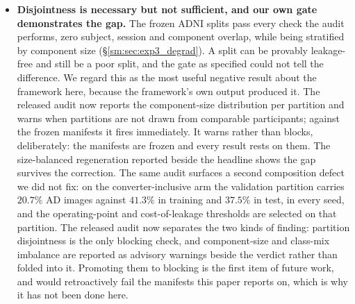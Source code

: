 \documentclass[11pt]{article}
\begin{document}
\begin{itemize}
          leaky and honest protocols; it establishes that identity is
          decodable, across sessions as well as within them, not that
          it causes the gap. The sex-related disparity rests on five
          seeds and one cohort. The clinical translation is anchored
          to a single fixed-specificity operating point and to
          US-population prevalence, is computed on ADNI only, and is
          an arithmetic re-expression rather than a deployment
          estimate. The dose-response slope is specific to this
          cohort, this representation and the subject-substitution
          injection mechanism; the DenseNet-121 fit is noisier
          ($R^2=0.64$ against $0.85$) and non-monotonic at $p=1$, so
          we present it as a same-direction check rather than an
          independent confirmation, and we do not claim the slope
          generalises.
          \item \textbf{Disjointness is necessary but not sufficient, and our own gate
          demonstrates the gap.} The frozen ADNI splits pass every check
          the audit performs, zero subject, session and component
          overlap, while being stratified by component size
          (\S\ref{sm:sec:exp3_degrad}). A split can be provably
          leakage-free and still be a poor split, and the gate as
          specified could not tell the difference. We regard this as the
          most useful negative result about the framework here, because
          the framework's own output produced it. The released audit now
          reports the component-size distribution per partition and
          warns when partitions are not drawn from comparable
          participants; against the frozen manifests it fires
          immediately. It warns rather than blocks, deliberately: the
          manifests are frozen and every result rests on them. The
          size-balanced regeneration reported beside the headline shows
          the gap survives the correction. The same audit surfaces a
          second composition defect we did not fix: on the
          converter-inclusive arm the validation partition carries
          $20.7\%$ AD images against $41.3\%$ in training and $37.5\%$
          in test, in every seed, and the operating-point and
          cost-of-leakage thresholds are selected on that partition.
          The released audit now separates the two kinds of finding:
          partition disjointness is the only blocking check, and
          component-size and class-mix imbalance are reported as
          advisory warnings beside the verdict rather than folded into
          it. Promoting them to blocking is the first item of future
          work, and would retroactively fail the manifests this paper
          reports on, which is why it has not been done here.


\end{itemize}
\end{document}
